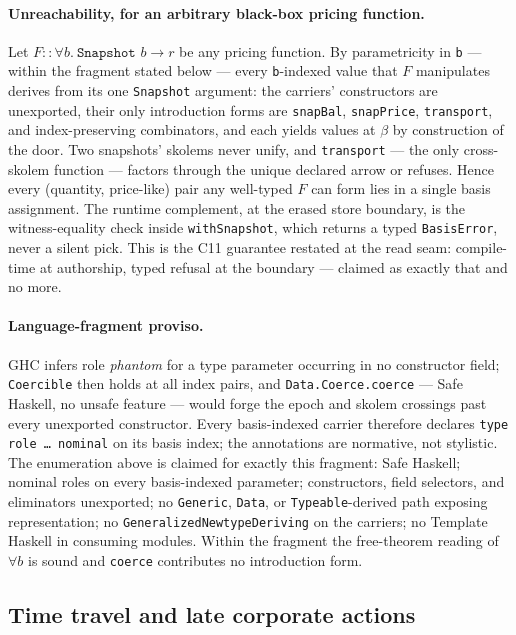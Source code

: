 \documentclass[11pt,a4paper]{article}
\begin{document}
\paragraph{Unreachability, for an arbitrary black-box pricing function.} Let
$F::\forall b.\ \texttt{Snapshot } b\to r$ be any pricing function. By parametricity in
\texttt{b} --- within the fragment stated below --- every \texttt{b}-indexed value that $F$
manipulates derives from its one \texttt{Snapshot} argument: the carriers' constructors
are unexported, their only introduction forms are \texttt{snapBal}, \texttt{snapPrice},
\texttt{transport}, and index-preserving combinators, and each yields values at $\beta$ by
construction of the door. Two snapshots' skolems never unify, and \texttt{transport} --- the
only cross-skolem function --- factors through the unique declared arrow or refuses.
Hence every (quantity, price-like) pair any well-typed $F$ can form lies in a single
basis assignment. The runtime complement, at the erased store boundary, is the
witness-equality check inside \texttt{withSnapshot}, which returns a typed
\texttt{BasisError}, never a silent pick. This is the C11 guarantee restated at the read
seam: compile-time at authorship, typed refusal at the boundary --- claimed as exactly
that and no more.

\paragraph{Language-fragment proviso.} GHC infers role \emph{phantom} for a type
parameter occurring in no constructor field; \texttt{Coercible} then holds at all index
pairs, and \texttt{Data.Coerce.coerce} --- Safe Haskell, no unsafe feature --- would
forge the epoch and skolem crossings past every unexported constructor. Every
basis-indexed carrier therefore declares \texttt{type role \dots\ nominal} on its basis
index; the annotations are normative, not stylistic. The enumeration above is claimed
for exactly this fragment: Safe Haskell; nominal roles on every basis-indexed parameter;
constructors, field selectors, and eliminators unexported; no \texttt{Generic},
\texttt{Data}, or \texttt{Typeable}-derived path exposing representation; no
\texttt{GeneralizedNewtypeDeriving} on the carriers; no Template Haskell in consuming
modules. Within the fragment the free-theorem reading of $\forall b$ is sound and
\texttt{coerce} contributes no introduction form.

\subsection{Time travel and late corporate actions}
\label{sec:basis-time-travel}
\end{document}
